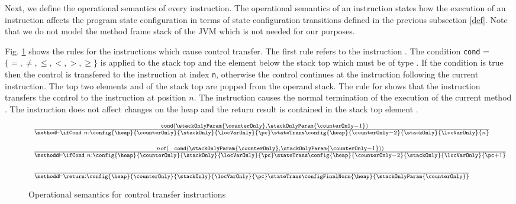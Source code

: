  

   
 Next, we define the operational semantics of every instruction. The operational semantics
 of an instruction states how the execution of an instruction affects the program state configuration 
 in terms of state configuration transitions defined in the previous subsection \ref{def}.
 Note that we do not model the method frame stack of the JVM which is not needed for our purposes. 

 Fig. \ref{opSem:jump} shows the rules for the instructions which cause control transfer. The first rule refers to
the instruction \ifCond. The condition \texttt{cond} = $\{ =, \neq, \le, <, >, \ge \} $ is applied to the stack top  \stackOnlyParam{\counterOnly} and the element below the stack top 
which must be of type \Myint. If the condition is true then the control is transfered to the instruction
  at index \texttt{n}, otherwise the control continues at the instruction following the current instruction. The top two elements \stackOnlyParam{\counterOnly} and
   of the stack top are popped from the operand stack. The rule for \goto{} shows that the instruction
 transfers the control to the instruction at position $n$.   
 The instruction \return{} causes the normal termination of the execution of the current method \methodd.
 The instruction does not affect changes on the heap \heap{} and the return result is contained in 
 the stack top element \stackOnlyParam{\counterOnly}.


\begin{figure}[ht!] 
\begin{frameit}
 $$ \begin{array}{l}
           {\scriptsize \frac{ \mbox{ \rm \texttt{ cond}}( \stackOnlyParam{\counterOnly}, \stackOnlyParam{\counterOnly - 1}) } 			       		               
                      {\method \vdash \ifCond \ n : \config{\heap }{\counterOnly}{\stackOnly}{\locVarOnly}{\pc}
		                      \stateTrans 
				      \config{\heap}{\counterOnly - 2}{\stackOnly}{\locVarOnly}{n}} 
            } \\    \\
		 {\scriptsize
                 \frac{  not (\mbox{ \rm \texttt{ cond}}( \stackOnlyParam{\counterOnly}, \stackOnlyParam{\counterOnly - 1})) }		                             
                     {\methodd \vdash \ifCond \ n : \config{\heap}{\counterOnly}{\stackOnly}{\locVarOnly}{\pc} 
		                    \stateTrans 
                                    \config{\heap}{\counterOnly - 2}{\stackOnly}{\locVarOnly}{\pc + 1}} } \\ \\
           {\scriptsize \frac{ } 
            {\methodd \vdash \return :\config{\heap}{\counterOnly}{\stackOnly}{\locVarOnly}{\pc} 
		                    \stateTrans 
                                    \configFinalNorm{\heap}{\stackOnlyParam{\counterOnly}}}   }
\end{array}
$$

\caption{\sc Operational semantics for control transfer instructions}
\label{opSem:jump}
\end{frameit}
\end{figure}



